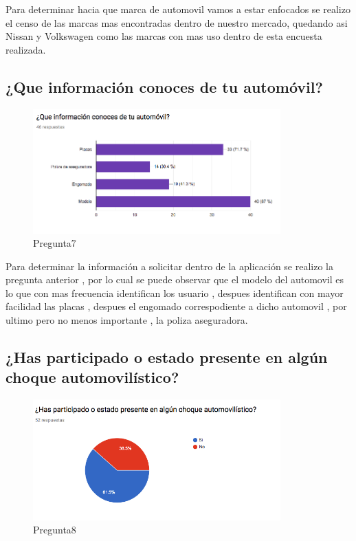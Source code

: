 Para determinar hacia que marca de automovil vamos a estar enfocados se realizo el censo de las marcas mas encontradas dentro de nuestro mercado, quedando asi  Nissan y Volkswagen como las marcas con mas uso dentro de esta encuesta realizada.\\

\subsection{¿Que información conoces de tu automóvil?}

\begin{figure}[htbp!]
	\begin{center}
		\includegraphics[width=0.85\textwidth]{DisenoEstructura/imagenes/Pregunta7}
		\caption{Pregunta7}
		\label{DE/FO/Pregunta7}
	\end{center}
\end{figure}

Para determinar la información a solicitar dentro de la aplicación se realizo la pregunta anterior , por lo cual se puede observar que el modelo del automovil es lo que con mas frecuencia identifican los usuario , despues identifican con mayor facilidad las placas , despues el engomado correspodiente a dicho automovil , por ultimo pero no menos importante , la poliza aseguradora.\\

\subsection{¿Has participado o estado presente en algún choque automovilístico?}

\begin{figure}[htbp!]
	\begin{center}
		\includegraphics[width=0.85\textwidth]{DisenoEstructura/imagenes/Pregunta8}
		\caption{Pregunta8}
		\label{DE/FO/Pregunta8}
	\end{center}
\end{figure}

